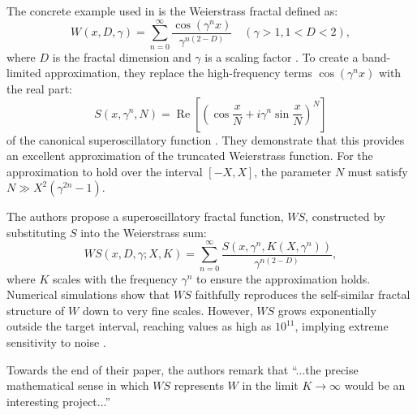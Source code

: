 \documentclass[reqno,11pt]{amsart}
\theoremstyle{definition}
\begin{document}
The concrete example used in \cite{berry2016fractals} is the Weierstrass fractal defined as:
\begin{equation}
W(x, D, \gamma) = \sum_{n=0}^{\infty} \frac{\cos(\gamma^n x)}{\gamma^{n(2-D)}} \quad (\gamma > 1, 1 < D < 2),
\end{equation}
where $D$ is the fractal dimension and $\gamma$ is a scaling factor \cite{mandelbrot1982}. To create a band-limited approximation, they replace the high-frequency terms $\cos(\gamma^n x)$ with the real part:
\begin{equation}
S(x, \gamma^n, N) = \operatorname{Re}\left[ \left(\cos \frac{x}{N} + i \gamma^n \sin \frac{x}{N}\right)^N \right]
\end{equation}
of the canonical superoscillatory function \cite{ACSST11}. They demonstrate that this provides an excellent approximation of the truncated Weierstrass function. For the approximation to hold  over the interval $[-X, X]$, the parameter $N$ must satisfy $N \gg X^2(\gamma^{2n} - 1)$.

The authors propose a superoscillatory fractal function, $WS$, constructed by substituting $S$ into the Weierstrass sum:
\begin{equation}
WS(x, D, \gamma; X, K) = \sum_{n=0}^{\infty} \frac{S(x, \gamma^n, K(X, \gamma^n))}{\gamma^{n(2-D)}},
\end{equation}
where $K$ scales with the frequency $\gamma^n$ to ensure the approximation holds. Numerical simulations show that $WS$ faithfully reproduces the self-similar fractal structure of $W$ down to very fine scales. However, $WS$ grows exponentially outside the target interval, reaching values as high as $10^{11}$, implying extreme sensitivity to noise \cite{berry2017noise}.

Towards the end of their paper, the authors remark that ``...the precise mathematical sense in which $WS$ represents $W$ in the limit $K \to \infty$ would be an interesting project...''
\end{document}
